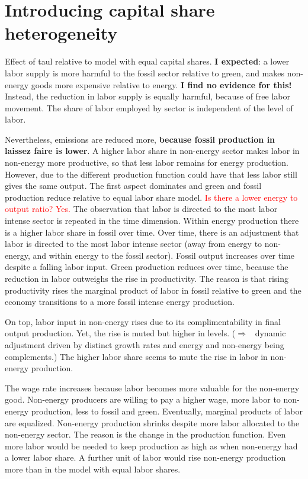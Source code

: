 \documentclass[12pt]{article}
\newcommand{\ar}{$\Rightarrow$ \ }
\newcommand{\tr}[1]{\textcolor{red}{#1}}
\begin{document}
\clearpage \newpage
\section{Introducing capital share heterogeneity}

Effect of taul relative to model with equal capital shares. \textbf{I expected}:  a lower labor supply is more harmful to the fossil sector relative to green, and makes non-energy goods more expensive relative to energy. \textbf{I find no evidence for this!} Instead, the reduction in labor supply is equally harmful, because of free labor movement. The share of labor employed by sector is independent of the level of labor. 

Nevertheless, emissions are reduced more, \textbf{because fossil production in laissez faire is lower}.
A higher labor share in non-energy sector makes labor in non-energy more productive, so that less labor remains for energy production. However, due to the different production function could have that less labor still gives the same output. The first aspect dominates and green and fossil production reduce relative to equal labor share model. \tr{Is there a lower energy to output ratio? Yes.}
The observation that labor is directed to the most labor intense sector is repeated in the time dimension. Within energy production there is a higher labor share in fossil over time. 
Over time, there is an adjustment that labor is directed to the most labor intense sector (away from energy to non-energy, and within energy to the fossil sector). 
 Fossil output increases over time despite a falling labor input. Green production reduces over time, because the reduction in labor outweighs the rise in productivity. The reason is that rising productivity rises the marginal product of labor in fossil relative to green and the economy transitions to a more fossil intense energy production. 
 
 On top, labor input in non-energy rises due to its complimentability in final output production. Yet, the rise is muted but higher in levels.  (\ar dynamic adjustment driven by distinct growth rates and energy and non-energy being complements.) The higher labor share seems to mute the rise in labor in non-energy production. 

The wage rate increases because labor becomes more valuable for the non-energy good. Non-energy producers are willing to pay a higher wage, more labor to non-energy production, less to fossil and green. Eventually, marginal products of labor are equalized. 
 Non-energy production shrinks despite more labor allocated to the non-energy sector. 
 The reason is the change in the production function. Even more labor would be needed to keep production as high as when non-energy had a lower labor share. A further unit of labor would rise non-energy production more than in the model with equal labor shares.
\end{document}
